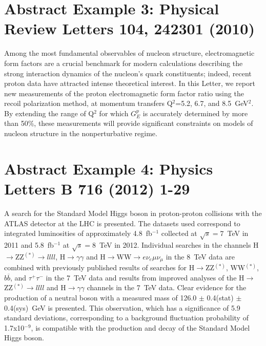 \documentclass{article}
\begin{document}
\section{Abstract Example 3: Physical Review Letters 104, 242301 (2010)}
Among the most fundamental observables of nucleon structure, electromagnetic
form factors are a crucial benchmark for modern calculations describing the
strong interaction dynamics of the nucleon's quark constituents; indeed,
recent proton data have attracted intense theoretical interest. In this
Letter, we report new measurements of the proton electromagnetic form factor
ratio using the recoil polarization method, at momentum transfers 
Q$^2$=5.2, 6.7, and 8.5~GeV$^2$. By extending the range of Q$^2$ for which
$G_E^p$ is accurately determined by more than 50\%, these measurements will
provide significant constraints on models of nucleon structure in the
nonperturbative regime.

\section{Abstract Example 4: Physics Letters B 716 (2012) 1-29}
A search for the Standard Model Higgs boson in proton-proton collisions
with the ATLAS detector at the LHC is presented. The datasets used correspond
to integrated luminosities of approximately 4.8~fb$^{-1}$ collected at
$\sqrt{s} = 7$~TeV in 2011 and 5.8~fb$^{-1}$ at $\sqrt{s} = 8$~TeV in 2012.
Individual searches in the channels H$\rightarrow$ZZ$^{(*)}\rightarrow llll$,
H$\rightarrow\gamma\gamma$ and 
H$\rightarrow$WW$\rightarrow e \nu_e \mu \nu_{\mu}$
in the 8~TeV data are combined with previously published
results of searches for H$\rightarrow$ZZ$^{(*)}$, WW$^{(*)}$, $b\overline{b}$,
and $\tau^+\tau^-$ in the 7~TeV data and results from improved analyses of
the H$\rightarrow$ZZ$^{(*)}\rightarrow llll$ and H$\rightarrow\gamma\gamma$
channels in the 7~TeV data. Clear evidence for the
production of a neutral boson with a measured mass of 126.0 $\pm$ 0.4(stat)
$\pm$ 0.4(sys)~GeV is presented. This observation, which has a significance
of 5.9 standard deviations, corresponding to a background fluctuation
probability of 1.7x10$^{-9}$, is compatible with the production and decay
of the Standard Model Higgs boson.
\end{document}
